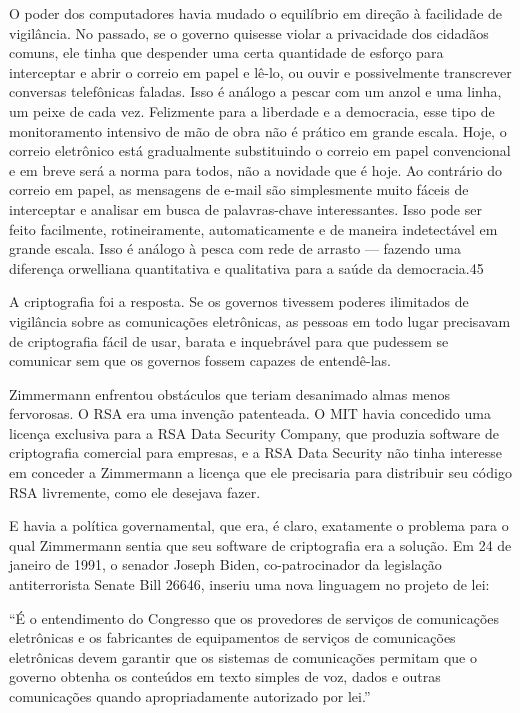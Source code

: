 \documentclass{book}
\begin{document}
O poder dos computadores havia mudado o equilíbrio em direção à facilidade de vigilância. No passado, se o governo quisesse violar a privacidade dos cidadãos comuns, ele tinha que despender uma certa quantidade de esforço para interceptar e abrir o correio em papel e lê-lo, ou ouvir e possivelmente transcrever conversas telefônicas faladas. Isso é análogo a pescar com um anzol e uma linha, um peixe de cada vez. Felizmente para a liberdade e a democracia, esse tipo de monitoramento intensivo de mão de obra não é prático em grande escala. Hoje, o correio eletrônico está gradualmente substituindo o correio em papel convencional e em breve será a norma para todos, não a novidade que é hoje. Ao contrário do correio em papel, as mensagens de e-mail são simplesmente muito fáceis de interceptar e analisar em busca de palavras-chave interessantes. Isso pode ser feito facilmente, rotineiramente, automaticamente e de maneira indetectável em grande escala. Isso é análogo à pesca com rede de arrasto --- fazendo uma diferença orwelliana quantitativa e qualitativa para a saúde da democracia.45

A criptografia foi a resposta. Se os governos tivessem poderes ilimitados de vigilância sobre as comunicações eletrônicas, as pessoas em todo lugar precisavam de criptografia fácil de usar, barata e inquebrável para que pudessem se comunicar sem que os governos fossem capazes de entendê-las.

Zimmermann enfrentou obstáculos que teriam desanimado almas menos fervorosas. O RSA era uma invenção patenteada. O MIT havia concedido uma licença exclusiva para a RSA Data Security Company, que produzia software de criptografia comercial para empresas, e a RSA Data Security não tinha interesse em conceder a Zimmermann a licença que ele precisaria para distribuir seu código RSA livremente, como ele desejava fazer.

E havia a política governamental, que era, é claro, exatamente o problema para o qual Zimmermann sentia que seu software de criptografia era a solução. Em 24 de janeiro de 1991, o senador Joseph Biden, co-patrocinador da legislação antiterrorista Senate Bill 26646, inseriu uma nova linguagem no projeto de lei:

``É o entendimento do Congresso que os provedores de serviços de comunicações eletrônicas e os fabricantes de equipamentos de serviços de comunicações eletrônicas devem garantir que os sistemas de comunicações permitam que o governo obtenha os conteúdos em texto simples de voz, dados e outras comunicações quando apropriadamente autorizado por lei.''
\end{document}

